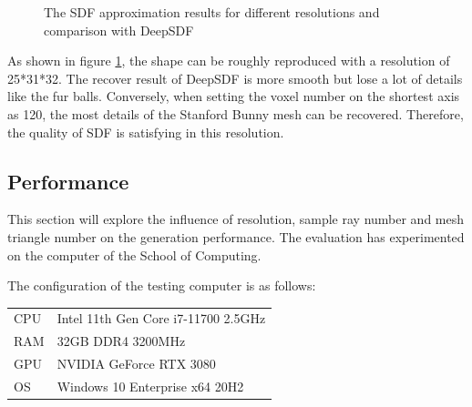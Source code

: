 \begin{figure}[htbp]
{\begin{minipage}[t]{0.475\linewidth}
    \end{minipage}%
    }%
    \caption{The SDF approximation results for different resolutions and comparison with DeepSDF \cite{park2019deepsdf}}
    \label{eva:resquality}
\end{figure}

As shown in figure \ref{eva:resquality}, the shape can be roughly reproduced with a resolution of 25*31*32. The recover result of DeepSDF \cite{park2019deepsdf} is more smooth but lose a lot of details like the fur balls. Conversely, when setting the voxel number on the shortest axis as 120, the most details of the Stanford Bunny mesh can be recovered. Therefore, the quality of SDF is satisfying in this resolution.

\clearpage

\subsection{Performance}

This section will explore the influence of resolution, sample ray number and mesh triangle number on the generation performance. The evaluation has experimented on the computer of the School of Computing.

\hspace*{\fill}

The configuration of the testing computer is as follows:

\hspace*{\fill}

\begin{tabular}{ll}
    CPU & Intel 11th Gen Core i7-11700 2.5GHz\\
    RAM & 32GB DDR4 3200MHz\\
    GPU &  NVIDIA GeForce RTX 3080\\
    OS & Windows 10 Enterprise x64 20H2
\end{tabular}

